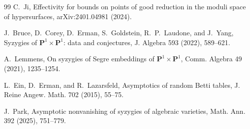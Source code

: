 \documentclass[11pt]{article}
\theoremstyle{definition}
\begin{document}
\begin{thebibliography}{99}
 C.~Ji, Effectivity for bounds on points of good reduction in the moduli space of hypersurfaces, arXiv:2401.04981 (2024).

 J.~Bruce, D.~Corey, D.~Erman, S.~Goldstein, R.~P.~Laudone, and J.~Yang, Syzygies of $\mathbf P^1\times\mathbf P^1$: data and conjectures, J. Algebra 593 (2022), 589--621.

 A.~Lemmens, On syzygies of Segre embeddings of $\mathbf P^1\times\mathbf P^1$, Comm. Algebra 49 (2021), 1235--1254.

 L.~Ein, D.~Erman, and R.~Lazarsfeld, Asymptotics of random Betti tables, J. Reine Angew. Math. 702 (2015), 55--75.

 J.~Park, Asymptotic nonvanishing of syzygies of algebraic varieties, Math. Ann. 392 (2025), 751--779.


\end{thebibliography}
\end{document}
